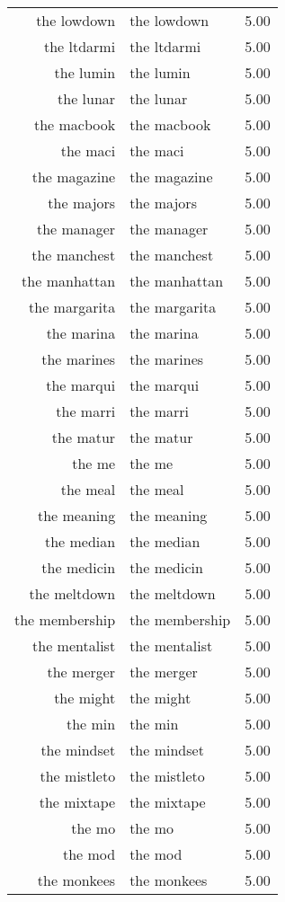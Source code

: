 \begin{table}[ht]
\begin{tabular}{rlr}
  the lowdown & the lowdown & 5.00 \\ 
  the ltdarmi & the ltdarmi & 5.00 \\ 
  the lumin & the lumin & 5.00 \\ 
  the lunar & the lunar & 5.00 \\ 
  the macbook & the macbook & 5.00 \\ 
  the maci & the maci & 5.00 \\ 
  the magazine & the magazine & 5.00 \\ 
  the majors & the majors & 5.00 \\ 
  the manager & the manager & 5.00 \\ 
  the manchest & the manchest & 5.00 \\ 
  the manhattan & the manhattan & 5.00 \\ 
  the margarita & the margarita & 5.00 \\ 
  the marina & the marina & 5.00 \\ 
  the marines & the marines & 5.00 \\ 
  the marqui & the marqui & 5.00 \\ 
  the marri & the marri & 5.00 \\ 
  the matur & the matur & 5.00 \\ 
  the me & the me & 5.00 \\ 
  the meal & the meal & 5.00 \\ 
  the meaning & the meaning & 5.00 \\ 
  the median & the median & 5.00 \\ 
  the medicin & the medicin & 5.00 \\ 
  the meltdown & the meltdown & 5.00 \\ 
  the membership & the membership & 5.00 \\ 
  the mentalist & the mentalist & 5.00 \\ 
  the merger & the merger & 5.00 \\ 
  the might & the might & 5.00 \\ 
  the min & the min & 5.00 \\ 
  the mindset & the mindset & 5.00 \\ 
  the mistleto & the mistleto & 5.00 \\ 
  the mixtape & the mixtape & 5.00 \\ 
  the mo & the mo & 5.00 \\ 
  the mod & the mod & 5.00 \\ 
  the monkees & the monkees & 5.00 \\ 

\end{tabular}
\end{table}
